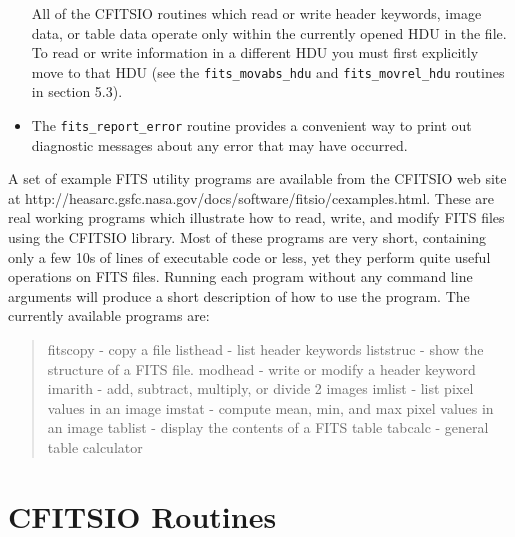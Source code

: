 \documentclass[11pt]{article}
\begin{document}
\begin{itemize}
All of the CFITSIO routines which read or write header keywords,
image data, or table data operate only within the currently opened
HDU in the file. To read or write information in a different HDU you must
first explicitly move to that HDU (see the {\tt fits\_movabs\_hdu} and
{\tt fits\_movrel\_hdu} routines in section 5.3).

\item

The {\tt fits\_report\_error} routine provides a convenient way to print out
diagnostic messages about any error that may have occurred. 

\end{itemize}

A set of example FITS utility programs are  available from the CFITSIO
web site at \newline
http://heasarc.gsfc.nasa.gov/docs/software/fitsio/cexamples.html.
These are real working programs which illustrate how to read, write,
and modify FITS files using the CFITSIO library.  Most of these
programs are very short, containing only a few 10s of lines of
executable code or less, yet they perform quite useful operations on
FITS files. Running each program without any command line arguments
will produce a short description of how to use the program.
The currently available programs are:
\begin{quote}
fitscopy - copy a file
\newline
listhead - list header keywords
\newline
liststruc - show the structure of a FITS file.
\newline
modhead  - write or modify a header keyword
\newline
imarith  - add, subtract, multiply, or divide 2 images
\newline
imlist  - list pixel values in an image
\newline
imstat  - compute mean, min, and max pixel values in an image
\newline
tablist - display the contents of a FITS table
\newline
tabcalc  - general table calculator
\end{quote}


\newpage

\section{CFITSIO Routines}
\end{document}
